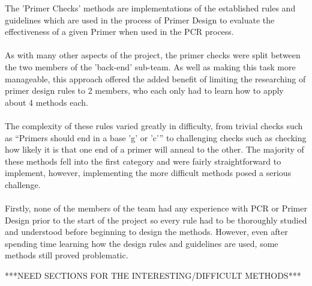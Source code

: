 The 'Primer Checks' methods are implementations of the established rules
and guidelines which are used in the process of Primer Design to
evaluate the effectiveness of a given Primer when used in the PCR
process.
\\ \\
As with many other aspects of the project, the primer checks were split
between the two members of the 'back-end' sub-team. As well as making
this task more manageable, this approach offered the added benefit of
limiting the researching of primer design rules to 2 members, who each
only had to learn how to apply about 4 methods each.
\\ \\
The complexity of these rules varied greatly in difficulty, from
trivial checks such as “Primers should end in a base 'g' or 'c'” to
challenging checks such as checking how likely it is that one end of a
primer  will anneal to the other. The majority of these methods fell
into the first category and were fairly straightforward to implement,
however,  implementing the more difficult methods posed a serious
challenge.
\\ \\
Firstly, none of the members of the team had any experience with PCR or
Primer Design prior to the start of the project so every rule had to be
thoroughly studied and understood before beginning to design the
methods. However, even after spending time learning how the design
rules and guidelines are used, some methods still proved problematic.

***NEED SECTIONS FOR THE INTERESTING/DIFFICULT METHODS***
